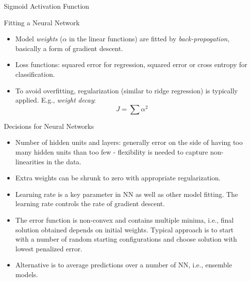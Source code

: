 \documentclass{beamer}
\begin{document}
\begin{frame}{Sigmoid Activation Function}
\begin{figure}
    \centering
\end{figure}
\end{frame}


\begin{frame}{Fitting a Neural Network}
    \begin{itemize}
        \item Model \textit{weights} ($\alpha$ in the linear functions) are fitted by \textit{back-propogation}, basically a form of gradient descent.
        \item Loss functions: squared error for regression, squared error or cross entropy for classification.
        \item To avoid overfitting, regularization (similar to ridge regression) is typically applied. E.g., \textit{weight decay}:
        \begin{equation*}
            J = \sum \alpha^2
        \end{equation*}
    \end{itemize}
\end{frame}


\begin{frame}{Decisions for Neural Networks}
    \begin{itemize}
        \item Number of hidden units and layers: generally error on the side of having too many hidden units than too few - flexibility is needed to capture non-linearities in the data.
        \item Extra weights can be shrunk to zero with appropriate regularization.
        \item Learning rate is a key parameter in NN as well as other model fitting. The learning rate controls the rate of gradient descent.
        \item The error function is non-convex and contains multiple minima, i.e., final solution obtained depends on initial weights. Typical approach is to start with a number of random starting configurations and choose solution with lowest penalized error.
        \item Alternative is to average predictions over a number of NN, i.e., ensemble models.
    \end{itemize}
\end{frame}
\end{document}
